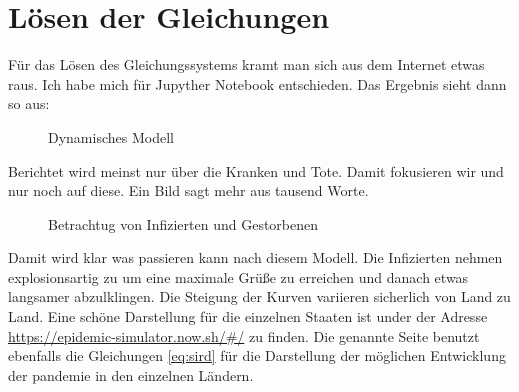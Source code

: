 \documentclass[11pt, a4paper]{article}
\begin{document}
\newpage
\section{Lösen der Gleichungen}

Für das Lösen des Gleichungssystems kramt man sich aus dem Internet etwas raus. Ich habe
mich für  Jupyther Notebook entschieden. Das Ergebnis sieht dann so aus:

\begin{figure}[h]
\centering
{}
\caption{Dynamisches Modell}
\label{plot:sird}
\end{figure}

Berichtet wird meinst nur über die Kranken und Tote. Damit fokusieren wir und nur noch auf
diese. Ein Bild sagt mehr aus tausend Worte.

\begin{figure}[h]
\centering
{}
\caption{Betrachtug von Infizierten und Gestorbenen}
\label{plot:id}
\end{figure}

Damit wird klar was passieren kann nach diesem Modell. Die Infizierten nehmen explosionsartig
zu um eine maximale Grüße zu erreichen und danach etwas langsamer abzulklingen. Die Steigung der
Kurven variieren sicherlich von Land zu Land. Eine schöne Darstellung für die einzelnen Staaten
ist under der Adresse \url{https://epidemic-simulator.now.sh/#/} zu finden. Die genannte Seite
benutzt ebenfalls die Gleichungen \ref{eq:sird} für die Darstellung der möglichen Entwicklung
der pandemie in den einzelnen Ländern.
\end{document}
